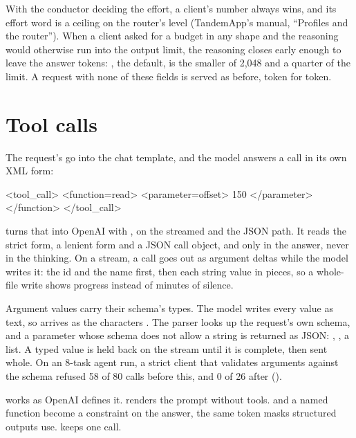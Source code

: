 With the conductor deciding the effort, a client's number always wins, and its effort word is a ceiling on the router's level (TandemApp's manual, \enquote{Profiles and the router}). When a client asked for a budget in any shape and the reasoning would otherwise run into the output limit, the reasoning closes early enough to leave the answer  tokens: , the default, is the smaller of 2,048 and a quarter of the limit. A request with none of these fields is served as before, token for token.

\section{Tool calls}

The request's  go into the chat template, and the model answers a call in its own XML form:

\begin{plain}
<tool_call>
<function=read>
<parameter=offset>
150
</parameter>
</function>
</tool_call>
\end{plain}

 turns that into OpenAI  with , on the streamed and the JSON path. It reads the strict form, a lenient form and a JSON call object, and only in the answer, never in the thinking. On a stream, a call goes out as argument deltas while the model writes it: the id and the name first, then each string value in pieces, so a whole-file write shows progress instead of minutes of silence.

Argument values carry their schema's types. The model writes every value as text, so  arrives as the characters . The parser looks up the request's own schema, and a parameter whose schema does not allow a string is returned as JSON: , , a list. A typed value is held back on the stream until it is complete, then sent whole. On an 8-task agent run, a strict client that validates arguments against the schema refused 58 of 80 calls before this, and 0 of 26 after (\measured).

 works as OpenAI defines it.  renders the prompt without tools.  and a named function become a constraint on the answer, the same token masks structured outputs use.  keeps one call.

